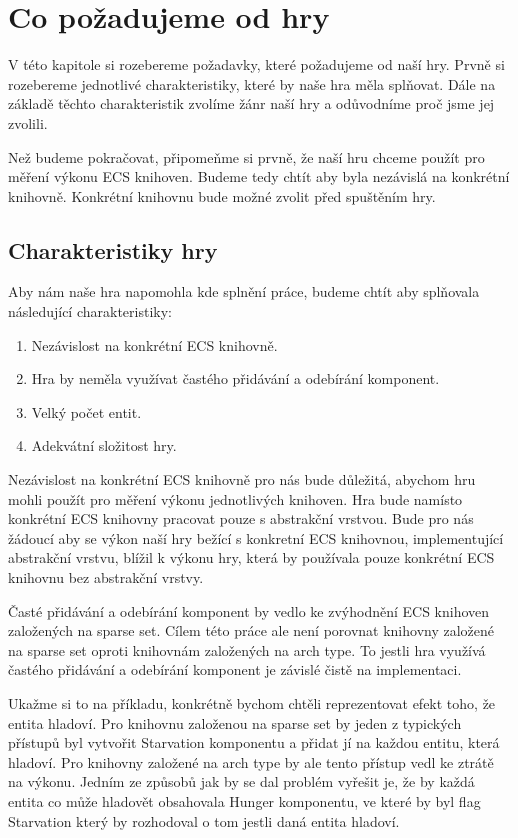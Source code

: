 \chapter{Co požadujeme od hry}
V této kapitole si rozebereme požadavky, které požadujeme od naší hry. Prvně si rozebereme jednotlivé charakteristiky, které by naše hra měla splňovat. Dále na základě těchto charakteristik zvolíme žánr naší hry a odůvodníme proč jsme jej zvolili.

Než budeme pokračovat, připomeňme si prvně, že naší hru chceme použít pro měření výkonu ECS knihoven. Budeme tedy chtít aby byla nezávislá na konkrétní knihovně. Konkrétní knihovnu bude možné zvolit před spuštěním hry.

\section{Charakteristiky hry}
Aby nám naše hra napomohla kde splnění práce, budeme chtít aby splňovala následující charakteristiky:

\begin{enumerate}
    \item Nezávislost na konkrétní ECS knihovně.
    \item Hra by neměla využívat častého přidávání a odebírání komponent.
    \item Velký počet entit.
    \item Adekvátní složitost hry.
\end{enumerate}

Nezávislost na konkrétní ECS knihovně pro nás bude důležitá, abychom hru mohli použít pro měření výkonu jednotlivých knihoven. Hra bude namísto konkrétní ECS knihovny pracovat pouze s abstrakční vrstvou. Bude pro nás žádoucí aby se výkon naší hry bežící s konkretní ECS knihovnou, implementující abstrakční vrstvu, blížil k výkonu hry, která by používala pouze konkrétní ECS knihovnu bez abstrakční vrstvy.

Časté přidávání a odebírání komponent by vedlo ke zvýhodnění ECS knihoven založených na sparse set. Cílem této práce ale není porovnat knihovny založené na sparse set oproti knihovnám založených na arch type. To jestli hra využívá častého přidávání a odebírání komponent je závislé čistě na implementaci. 

Ukažme si to na příkladu, konkrétně bychom chtěli reprezentovat efekt toho, že entita hladoví. Pro knihovnu založenou na sparse set by jeden z typických přístupů byl vytvořit Starvation komponentu a přidat jí na každou entitu, která hladoví. Pro knihovny založené na arch type by ale tento přístup vedl ke ztrátě na výkonu. Jedním ze způsobů jak by se dal problém vyřešit je, že by každá entita co může hladovět obsahovala Hunger komponentu, ve které by byl flag Starvation který by rozhodoval o tom jestli daná entita hladoví.

